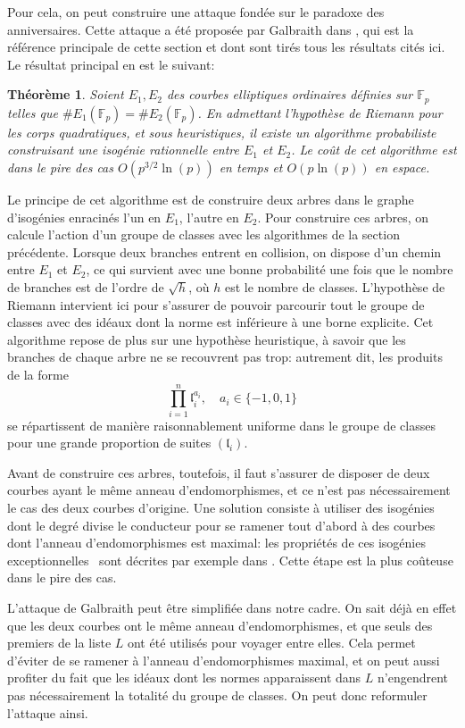 \documentclass[11pt,a4paper]{article}
\newcommand{\F}{\mathbb{F}}
\renewcommand{\frak}{\mathfrak}
\renewcommand{\v}{\vspace{5mm}}
\newtheorem*{thm}{Théorème}
\theoremstyle{definition}
\begin{document}
\v
Pour cela, on peut construire une attaque fondée sur le \og paradoxe des anniversaires\fg. Cette attaque a été proposée par Galbraith dans \cite{Galbraith}, qui est la référence principale de cette section et dont sont tirés tous les résultats cités ici. Le résultat principal en est le suivant:

\begin{thm}
Soient $E_1, E_2$ des courbes elliptiques ordinaires définies sur $\F_p$ telles que $\#E_1(\F_p) = \#E_2(\F_p)$. En admettant l'hypothèse de Riemann pour les corps quadratiques, et sous heuristiques, il existe un algorithme probabiliste construisant une isogénie rationnelle entre $E_1$ et $E_2$. Le coût de cet algorithme est dans le pire des cas $O(p^{3/2}\ln(p))$ en temps et $O(p \ln(p))$ en espace.
\end{thm}

Le principe de cet algorithme est de construire deux arbres dans le graphe d'isogénies enracinés l'un en $E_1$, l'autre en $E_2$. Pour construire ces arbres, on calcule l'action d'un groupe de classes avec les algorithmes de la section précédente. Lorsque deux branches entrent en collision, on dispose d'un chemin entre $E_1$ et $E_2$, ce qui survient avec une bonne probabilité une fois que le nombre de branches est de l'ordre de $\sqrt{h}$, où $h$ est le nombre de classes. L'hypothèse de Riemann intervient ici pour s'assurer de pouvoir parcourir tout le groupe de classes avec des idéaux dont la norme est inférieure à une borne explicite. Cet algorithme repose de plus sur une hypothèse heuristique, à savoir que les branches de chaque arbre ne se recouvrent pas trop: autrement dit, les produits de la forme
$$\prod_{i = 1}^n {\frak l}_i^{a_i}, \quad a_i\in \{-1,0,1\}$$
se répartissent de manière raisonnablement uniforme dans le groupe de classes pour une grande proportion de suites $({\frak l}_i)$.

Avant de construire ces arbres, toutefois, il faut s'assurer de disposer de deux courbes ayant le même anneau d'endomorphismes, et ce n'est pas nécessairement le cas des deux courbes d'origine. Une solution consiste à utiliser des isogénies dont le degré divise le conducteur pour se ramener tout d'abord à des courbes dont l'anneau d'endomorphismes est maximal: les propriétés de ces isogénies \og exceptionnelles \fg\ sont décrites par exemple dans \cite{Kohel}. Cette étape est la plus coûteuse dans le pire des cas.
\v

L'attaque de Galbraith peut être simplifiée dans notre cadre. On sait déjà en effet que les deux courbes ont le même anneau d'endomorphismes, et que seuls des premiers de la liste $L$ ont été utilisés pour voyager entre elles. Cela permet d'éviter de se ramener à l'anneau d'endomorphismes maximal, et on peut aussi profiter du fait que les idéaux dont les normes apparaissent dans $L$ n'engendrent pas nécessairement la totalité du groupe de classes. On peut donc reformuler l'attaque ainsi.
\end{document}

